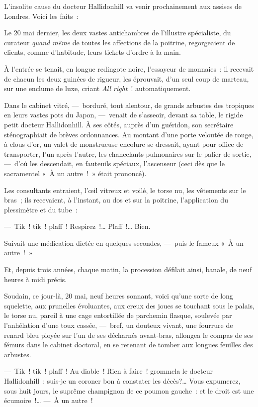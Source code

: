 \documentclass[french,twoside]{book} %
\newcommand{\bibl}[1]{{\RaggedLeft{#1}\par\bigskip}}
\begin{document}
\bibl{Adage officiel de {\scshape Broussais}.}
\noindent L’insolite cause du docteur Hallidonhill va venir prochainement aux assises de Londres. Voici les faits :\par
Le 20 mai dernier, les deux vastes antichambres de l’illustre spécialiste, du curateur \emph{quand même} de toutes les affections de la poitrine, regorgeaient de clients, comme d’habitude, leurs tickets d’ordre à la main.\par
À l’entrée se tenait, en longue redingote noire, l’essayeur de monnaies : il recevait de chacun les deux guinées de rigueur, les éprouvait, d’un seul coup de marteau, sur une enclume   de luxe, criant \emph{All right} ! automatiquement.\par
Dans le cabinet vitré, — borduré, tout alentour, de grands arbustes des tropiques en leurs vastes pots du Japon, — venait de s’asseoir, devant sa table, le rigide petit docteur Hallidonhill. À ses côtés, auprès d’un guéridon, son secrétaire sténographiait de brèves ordonnances. Au montant d’une porte veloutée de rouge, à clous d’or, un valet de monstrueuse encolure se dressait, ayant pour office de transporter, l’un après l’autre, les chancelants pulmonaires sur le palier de sortie, — d’où les descendait, en fauteuils spéciaux, l’ascenseur (ceci dès que le sacramentel « À un autre ! » était prononcé).\par
Les consultants entraient, l’œil vitreux et voilé, le torse nu, les vêtements sur le bras ; ils recevaient, à l’instant, au dos et sur la poitrine, l’application du plessimètre et du tube :\par
— Tik ! tik ! plaff ! Respirez !… Plaff !… Bien.\par
Suivait une médication dictée en quelques secondes, — puis le fameux « À un autre ! »\par
Et, depuis trois années, chaque matin, la procession   défilait ainsi, banale, de neuf heures à midi précis.\par
Soudain, ce jour-là, 20 mai, neuf heures sonnant, voici qu’une sorte de long squelette, aux prunelles évoluantes, aux creux des joues se touchant sous le palais, le torse nu, pareil à une cage entortillée de parchemin flasque, soulevée par l’anhélation d’une toux cassée, — bref, un douteux vivant, une fourrure de renard bleu ployée sur l’un de ses décharnés avant-bras, allongea le compas de ses fémurs dans le cabinet doctoral, en se retenant de tomber aux longues feuilles des arbustes.\par
— Tik ! tik ! plaff ! Au diable ! Rien à faire ! grommela le docteur Hallidonhill : suis-je un coroner bon à constater les décès?… Vous expumerez, sous huit jours, le suprême champignon de ce poumon gauche : et le droit est une écumoire !… — À un autre !\par
\end{document}
